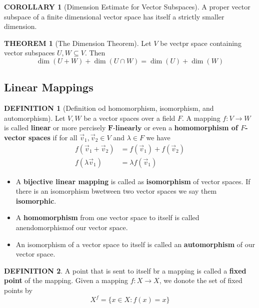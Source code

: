 \documentclass[12pt]{article}
\theoremstyle{definition}
\newtheorem{definition}{DEFINITION}[subsection]
\newtheorem{theorem}{THEOREM}[subsection]
\newtheorem{corollary}{COROLLARY}[subsection]
\begin{document}
\begin{corollary}[Dimension Estimate for Vector Subspaces]
    A proper vector subspace of a finite dimensional vector space has itself a strictly smaller dimension.
\end{corollary}

\begin{theorem}[The Dimension Theorem]
    Let $V$ be vectpr space containing vector subspaces $U,W \subseteq V$. Then
    $$\dim(U + W) + \dim(U\cap W) = \dim(U) + \dim(W)$$
\end{theorem}

\subsection{Linear Mappings}
\begin{definition}[Definition od homomorphism, isomorphism, and automorphism]
    Let $V,W$ be a vector spaces over a field $F$. A mapping $f: V \rightarrow W$ is called \textbf{linear} or more percisely $\mathbf{F}\textbf{-linearly}$ or even a \textbf{homomorphism of $F$-vector spaces} if for all $\overrightarrow{v}_1, \overrightarrow{v}_2 \in V$ and $\lambda \in F$ we have \[\begin{split}
        f(\overrightarrow{v}_1 + \overrightarrow{v}_2) &= f(\overrightarrow{v}_1) + f(\overrightarrow{v}_2)\\
        f(\lambda\overrightarrow{v}_1) &= \lambda f(\overrightarrow{v}_1) 
    \end{split}\]
\end{definition}

\begin{itemize}
    \item A \textbf{bijective linear mapping} is called as \textbf{isomorphism} of vector spaces. If there is an isomorphism bwetween two vector spaces we say them \textbf{isomorphic}.
    \item A \textbf{homomorphism} from one vector space to itself is called anendomorphismof our vector space.
    \item An isomorphism of a vector space to itself is called an \textbf{automorphism} of our vector space.
\end{itemize}

\begin{definition}
    A point that is sent to itself br a mapping is called a \textbf{fixed point} of the mapping.
    Given a mapping $f: X \rightarrow X$, we donote the set of fixed points by $$X^f = \{x \in X: f(x) = x\}$$
\end{definition}
\end{document}
